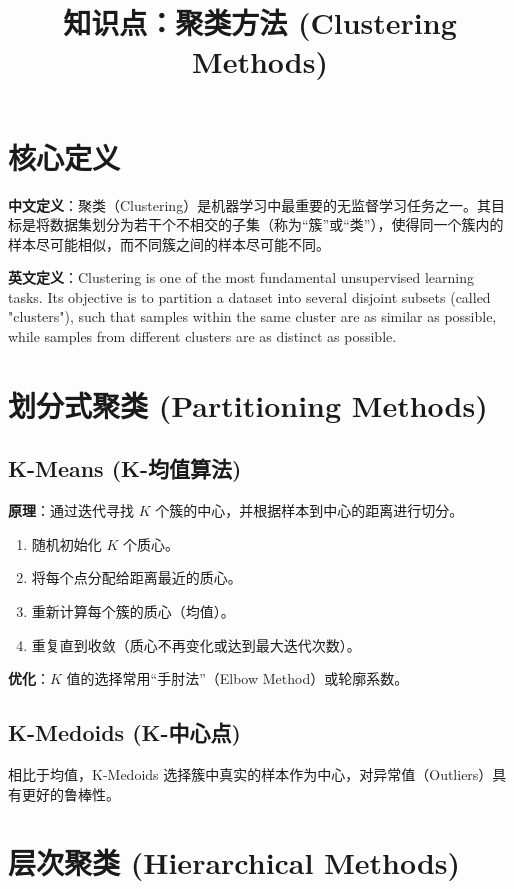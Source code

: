 \documentclass[12pt, a4paper]{article}
\title{知识点：聚类方法 (Clustering Methods)}
\author{}
\date{}
\begin{document}
\maketitle

\section{核心定义}
\textbf{中文定义}：聚类（Clustering）是机器学习中最重要的无监督学习任务之一。其目标是将数据集划分为若干个不相交的子集（称为“簇”或“类”），使得同一个簇内的样本尽可能相似，而不同簇之间的样本尽可能不同。

\textbf{英文定义}：Clustering is one of the most fundamental unsupervised learning tasks. Its objective is to partition a dataset into several disjoint subsets (called "clusters"), such that samples within the same cluster are as similar as possible, while samples from different clusters are as distinct as possible.

\section{划分式聚类 (Partitioning Methods)}

\subsection{K-Means (K-均值算法)}
\textbf{原理}：通过迭代寻找 $K$ 个簇的中心，并根据样本到中心的距离进行切分。
\begin{enumerate}
    \item 随机初始化 $K$ 个质心。
    \item 将每个点分配给距离最近的质心。
    \item 重新计算每个簇的质心（均值）。
    \item 重复直到收敛（质心不再变化或达到最大迭代次数）。
\end{enumerate}
\textbf{优化}：$K$ 值的选择常用“手肘法”（Elbow Method）或轮廓系数。

\subsection{K-Medoids (K-中心点)}
相比于均值，K-Medoids 选择簇中真实的样本作为中心，对异常值（Outliers）具有更好的鲁棒性。

\section{层次聚类 (Hierarchical Methods)}
\end{document}
